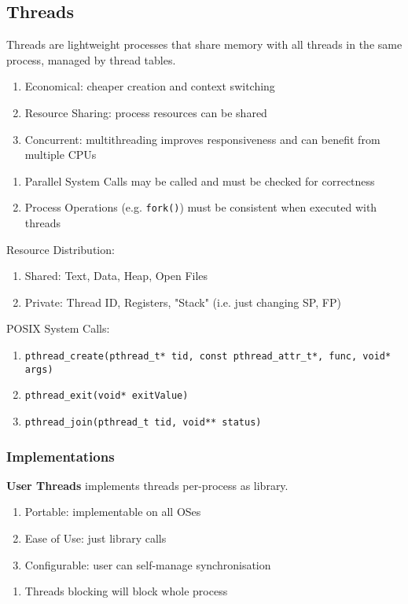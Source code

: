 \documentclass[12pt, a4paper]{article}
\begin{document}
\begin{multicols*}{3}
\subsection{Threads}
Threads are lightweight processes that share memory with all threads in the same process, managed by thread tables.
\begin{enumerate}[$+$]
  \item Economical: cheaper creation and context switching
  \item Resource Sharing: process resources can be shared
  \item Concurrent: multithreading improves responsiveness and can benefit from multiple CPUs
\end{enumerate}\vspace{-1pt}
\begin{enumerate}[$-$]
  \item Parallel System Calls may be called and must be checked for correctness
  \item Process Operations (e.g. \lstinline|fork()|) must be consistent when executed with threads
\end{enumerate}

Resource Distribution:
\begin{enumerate}[\roman*.]
  \item Shared: Text, Data, Heap, Open Files 
  \item Private: Thread ID, Registers, "Stack" (i.e. just changing SP, FP)
\end{enumerate}

POSIX System Calls:
\begin{enumerate}[\roman*.]
  \item \lstinline|pthread_create(pthread_t* tid, const pthread_attr_t*, func, void* args)|
  \item \lstinline|pthread_exit(void* exitValue)|
  \item \lstinline|pthread_join(pthread_t tid, void** status)|
\end{enumerate}

\subsubsection{Implementations}
\textbf{User Threads} implements threads per-process as library. 
\begin{enumerate}[$+$]
  \item Portable: implementable on all OSes 
  \item Ease of Use: just library calls 
  \item Configurable: user can self-manage synchronisation
\end{enumerate}\vspace{-1pt}
\begin{enumerate}[$-$]
  \item Threads blocking will block whole process
\end{enumerate}


\end{multicols*}
\end{document}
